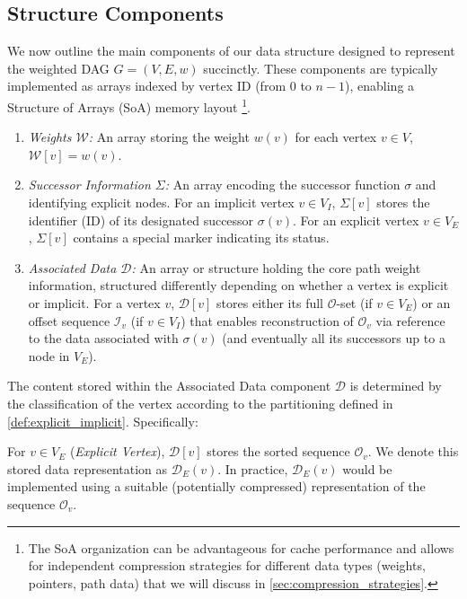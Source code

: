 \subsection{Structure Components}
\label{subsec:structure_components}

We now outline the main components of our data structure designed to represent the weighted DAG $G=(V,E,w)$ succinctly. These components are typically implemented as arrays indexed by vertex ID (from $0$ to $n-1$), enabling a Structure of Arrays (SoA) memory layout \footnote{The SoA organization can be advantageous for cache performance and allows for independent compression strategies for different data types (weights, pointers, path data) that we will discuss in \autoref{sec:compression_strategies}.}.

\begin{enumerate}
    \item \emph{Weights $\mathcal{W}$:} An array storing the weight $w(v)$ for each vertex $v \in V$, $\mathcal{W}[v] = w(v)$.
    \item \emph{Successor Information $\Sigma$:} An array encoding the successor function $\sigma$ and identifying explicit nodes. For an implicit vertex $v \in V_I$, $\Sigma[v]$ stores the identifier (ID) of its designated successor $\sigma(v)$. For an explicit vertex $v \in V_E$, $\Sigma[v]$ contains a special marker indicating its status.
    \item \emph{Associated Data $\mathcal{D}$:} An array or structure holding the core path weight information, structured differently depending on whether a vertex is explicit or implicit. For a vertex $v$, $\mathcal{D}[v]$ stores either its full $\mathcal{O}$-set (if $v \in V_E$) or an offset sequence $\mathcal{I}_v$ (if $v \in V_I$) that enables reconstruction of $\mathcal{O}_v$ via reference to the data associated with $\sigma(v)$ (and eventually all its successors up to a node in $V_E$).
\end{enumerate}

The content stored within the Associated Data component $\mathcal{D}$ is determined by the classification of the vertex according to the partitioning defined in \ref{def:explicit_implicit}. Specifically:

For $v \in V_E$ (\emph{Explicit Vertex}), $\mathcal{D}[v]$ stores the sorted sequence $\mathcal{O}_v$. We denote this stored data representation as $\mathcal{D}_E(v)$. In practice, $\mathcal{D}_E(v)$ would be implemented using a suitable (potentially compressed) representation of the sequence $\mathcal{O}_v$.

